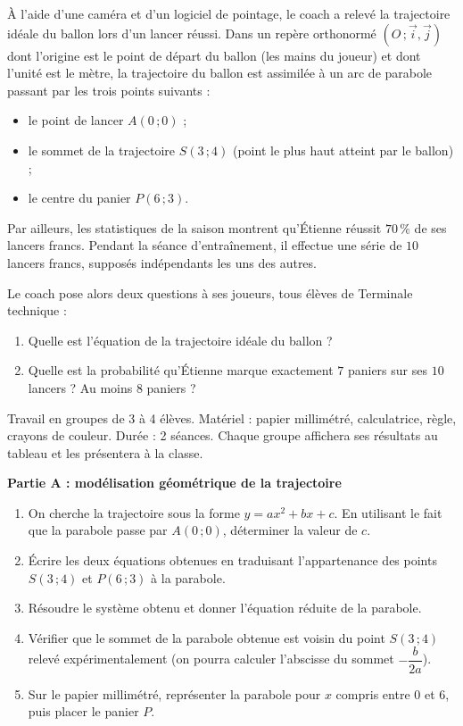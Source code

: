 \documentclass[11pt]{article}
\newcommand{\cle}[1]{{\popxbold\color{popdark}#1}}
\newcounter{popsec}
\newcounter{popsub}
\newcommand{\courssub}[1]{%
  \stepcounter{popsub}%
  \par\vspace{9pt}\noindent{\popxbold\fontsize{11.5}{13}\selectfont\color{popink}{\color{poporange}\thepopsec.\thepopsub}\hspace{6pt}#1}\par\nopagebreak\vspace{4pt}
}
\begin{document}
À l'aide d'une caméra et d'un logiciel de pointage, le coach a relevé la trajectoire idéale du ballon lors d'un lancer réussi. Dans un repère orthonormé $(O\,;\vec{i},\vec{j})$ dont l'origine est le point de départ du ballon (les mains du joueur) et dont l'unité est le mètre, la trajectoire du ballon est assimilée à un arc de \cle{parabole} passant par les trois points suivants :
\begin{itemize}
\item le point de lancer $A(0\,;0)$ ;
\item le sommet de la trajectoire $S(3\,;4)$ (point le plus haut atteint par le ballon) ;
\item le centre du panier $P(6\,;3)$.
\end{itemize}

Par ailleurs, les statistiques de la saison montrent qu'Étienne réussit $70\,\%$ de ses lancers francs. Pendant la séance d'entraînement, il effectue une série de $10$ lancers francs, supposés indépendants les uns des autres.

Le coach pose alors deux questions à ses joueurs, tous élèves de Terminale technique :
\begin{enumerate}
\item Quelle est l'équation de la trajectoire idéale du ballon ?
\item Quelle est la probabilité qu'Étienne marque exactement $7$ paniers sur ses $10$ lancers ? Au moins $8$ paniers ?
\end{enumerate}

\courssub{Consignes}

Travail en groupes de 3 à 4 élèves. Matériel : papier millimétré, calculatrice, règle, crayons de couleur. Durée : 2 séances. Chaque groupe affichera ses résultats au tableau et les présentera à la classe.

\textbf{Partie A : modélisation géométrique de la trajectoire}

\begin{enumerate}
\item On cherche la trajectoire sous la forme $y = ax^2 + bx + c$. En utilisant le fait que la parabole passe par $A(0\,;0)$, déterminer la valeur de $c$.
\item Écrire les deux équations obtenues en traduisant l'appartenance des points $S(3\,;4)$ et $P(6\,;3)$ à la parabole.
\item Résoudre le système obtenu et donner l'équation réduite de la parabole.
\item Vérifier que le sommet de la parabole obtenue est voisin du point $S(3\,;4)$ relevé expérimentalement (on pourra calculer l'abscisse du sommet $-\dfrac{b}{2a}$).
\item Sur le papier millimétré, représenter la parabole pour $x$ compris entre $0$ et $6$, puis placer le panier $P$.
\end{enumerate}
\end{document}
